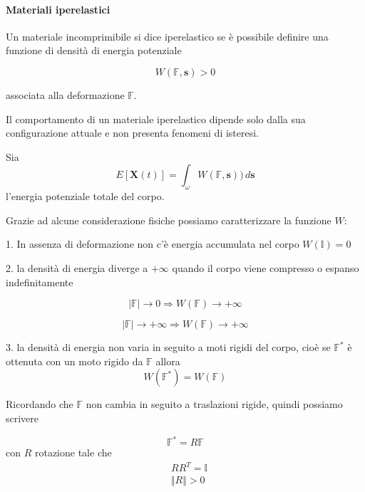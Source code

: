 %
\paragraph{Materiali iperelastici}

Un materiale incomprimibile si dice iperelastico se è possibile definire una funzione di densità di energia potenziale

\begin{equation*}
W(\mathbb{F},\mathbf{s}) > 0
\end{equation*}

associata alla deformazione $\mathbb{F}$.

Il comportamento di un materiale iperelastico dipende solo dalla sua configurazione attuale e non presenta fenomeni di isteresi.

Sia 
\begin{equation*}
E [  \mathbf{X}(t) ] = \int_{\omega} W( \mathbb{F}, \mathbf{s} )) \, d\mathbf{s}
\end{equation*}
l'energia potenziale totale del corpo.

Grazie ad alcune considerazione fisiche possiamo caratterizzare la funzione $W$:

1. In assenza di deformazione non c'è energia accumulata nel corpo $W(\mathbb{I}) = 0$

2. la densità di energia diverge a $+\infty$ quando il corpo viene compresso o espanso indefinitamente  

\begin{equation*}
\vert \mathbb{F} \vert \rightarrow 0 \Rightarrow W(\mathbb{F}) \rightarrow +\infty
\end{equation*}

\begin{equation*}
\vert \mathbb{F} \vert \rightarrow +\infty \Rightarrow W(\mathbb{F}) \rightarrow +\infty
\end{equation*}

3.  la densità di energia non varia in seguito a moti rigidi del corpo, cioè se $\mathbb{F}^*$ è ottenuta con un moto rigido da $\mathbb{F}$ allora 
\begin{equation*}
W(\mathbb{F}^*) = W(\mathbb{F})
\end{equation*}

Ricordando che $\mathbb{F}$ non cambia in seguito a traslazioni rigide, quindi possiamo scrivere

\begin{equation*}
\mathbb{F}^* = R\mathbb{F}
\end{equation*}
con $R$ rotazione tale che 
\begin{align*}
&RR^T = \mathbb{I} \\
&\Vert R \Vert > 0
\end{align*}

